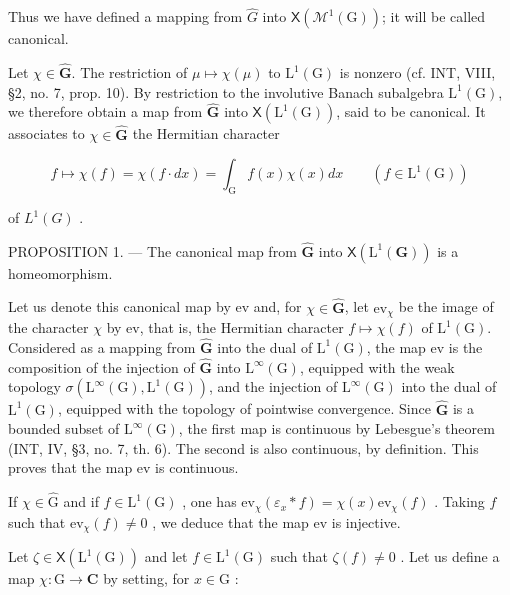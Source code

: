 Thus we have defined a mapping from \(\widehat{G}\) into \(\mathsf{X}(\mathcal{M}^{1}(\mathrm{G}))\); it will be called canonical.

Let \(\chi \in \widehat{\mathbf{G}}\). The restriction of \(\mu \mapsto \chi(\mu)\) to \(\mathrm{L}^1(\mathrm{G})\) is nonzero (cf. INT, VIII, §2, no. 7, prop. 10). By restriction to the involutive Banach subalgebra \(\mathrm{L}^1(\mathrm{G})\), we therefore obtain a map from \(\widehat{\mathbf{G}}\) into \(\mathsf{X}(\mathrm{L}^1(\mathrm{G}))\), said to be canonical. It associates to \(\chi \in \widehat{\mathbf{G}}\) the Hermitian character

\[
f \mapsto \chi (f) = \chi (f \cdot d x) = \int_ {\mathrm{G}} f (x) \chi (x) d x \qquad (f \in \mathrm{L} ^ {1} (\mathrm{G}))\tag{2}
\]

of \(L^{1}(G)\) .

PROPOSITION 1. --- The canonical map from \(\widehat{\mathbf{G}}\) into \(\mathsf{X}(\mathrm{L}^{1}(\mathbf{G}))\) is a homeomorphism.

Let us denote this canonical map by ev and, for \(\chi \in \widehat{\mathbf{G}}\), let \(\mathrm{ev}_{\chi}\) be the image of the character \(\chi\) by ev, that is, the Hermitian character \(f \mapsto \chi(f)\) of \(\mathrm{L}^1(\mathrm{G})\). Considered as a mapping from \(\widehat{\mathbf{G}}\) into the dual of \(\mathrm{L}^1(\mathrm{G})\), the map ev is the composition of the injection of \(\widehat{\mathbf{G}}\) into \(\mathrm{L}^{\infty}(\mathrm{G})\), equipped with the weak topology \(\sigma(\mathrm{L}^{\infty}(\mathrm{G}), \mathrm{L}^{1}(\mathrm{G}))\), and the injection of \(\mathrm{L}^{\infty}(\mathrm{G})\) into the dual of \(\mathrm{L}^1(\mathrm{G})\), equipped with the topology of pointwise convergence. Since \(\widehat{\mathbf{G}}\) is a bounded subset of \(\mathrm{L}^{\infty}(\mathrm{G})\), the first map is continuous by Lebesgue's theorem (INT, IV, §3, no. 7, th. 6). The second is also continuous, by definition. This proves that the map ev is continuous.

If \(\chi \in \widehat{\mathrm{G}}\) and if \(f \in \mathrm{L}^1(\mathrm{G})\) , one has \(\mathrm{ev}_{\chi}(\varepsilon_x * f) = \chi(x)\mathrm{ev}_{\chi}(f)\) . Taking \(f\) such that \(\mathrm{ev}_{\chi}(f) \neq 0\) , we deduce that the map ev is injective.

Let \(\zeta\in\mathsf{X}(\mathrm{L}^{1}(\mathrm{G}))\) and let \(f\in\mathrm{L}^{1}(\mathrm{G})\) such that \(\zeta(f)\neq0\) . Let us define a map \(\chi\colon\mathrm{G}\to\mathbf{C}\) by setting, for \(x\in\mathrm{G}\) :

